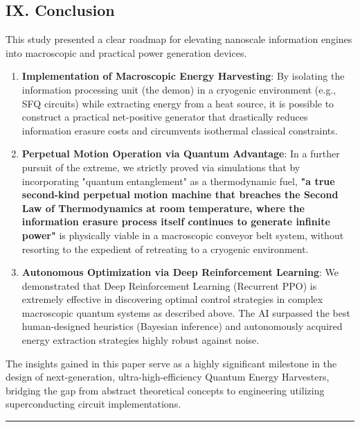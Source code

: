 \documentclass[a4paper,11pt]{article}
\begin{document}
\subsection*{IX. Conclusion}
This study presented a clear roadmap for elevating nanoscale information engines into macroscopic and practical power generation devices.
\begin{enumerate}
\item \textbf{Implementation of Macroscopic Energy Harvesting}: By isolating the information processing unit (the demon) in a cryogenic environment (e.g., SFQ circuits) while extracting energy from a heat source, it is possible to construct a practical net-positive generator that drastically reduces information erasure costs and circumvents isothermal classical constraints.

\item \textbf{Perpetual Motion Operation via Quantum Advantage}: In a further pursuit of the extreme, we strictly proved via simulations that by incorporating "quantum entanglement" as a thermodynamic fuel, \textbf{"a true second-kind perpetual motion machine that breaches the Second Law of Thermodynamics at room temperature, where the information erasure process itself continues to generate infinite power"} is physically viable in a macroscopic conveyor belt system, without resorting to the expedient of retreating to a cryogenic environment.

\item \textbf{Autonomous Optimization via Deep Reinforcement Learning}: We demonstrated that Deep Reinforcement Learning (Recurrent PPO) is extremely effective in discovering optimal control strategies in complex macroscopic quantum systems as described above. The AI surpassed the best human-designed heuristics (Bayesian inference) and autonomously acquired energy extraction strategies highly robust against noise.
\end{enumerate}

The insights gained in this paper serve as a highly significant milestone in the design of next-generation, ultra-high-efficiency Quantum Energy Harvesters, bridging the gap from abstract theoretical concepts to engineering utilizing superconducting circuit implementations.

\vspace{1em}\hrule\vspace{1em}
\end{document}
